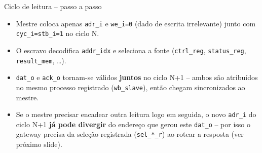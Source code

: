 \documentclass[aspectratio=169,10pt]{beamer}
\begin{document}
\begin{frame}{Ciclo de leitura -- passo a passo}
  \begin{itemize}
    \item Mestre coloca apenas \texttt{adr\_i} e \texttt{we\_i=0} (dado de escrita
      irrelevante) junto com \texttt{cyc\_i=stb\_i=1} no ciclo N.
    \item O escravo decodifica \texttt{addr\_idx} e seleciona a fonte
      (\texttt{ctrl\_reg}, \texttt{status\_reg}, \texttt{result\_mem}, \dots).
    \item \texttt{dat\_o} e \texttt{ack\_o} tornam-se válidos \textbf{juntos} no
      ciclo N+1 -- ambos são atribuídos no mesmo processo registrado
      (\texttt{wb\_slave}), então chegam sincronizados ao mestre.
    \item Se o mestre precisar encadear outra leitura logo em seguida, o novo
      \texttt{adr\_i} do ciclo N+1 \textbf{já pode divergir} do endereço que
      gerou este \texttt{dat\_o} -- por isso o gateway precisa da seleção
      registrada (\texttt{sel\_*\_r}) ao rotear a resposta (ver próximo slide).
  \end{itemize}
\end{frame}
\end{document}
